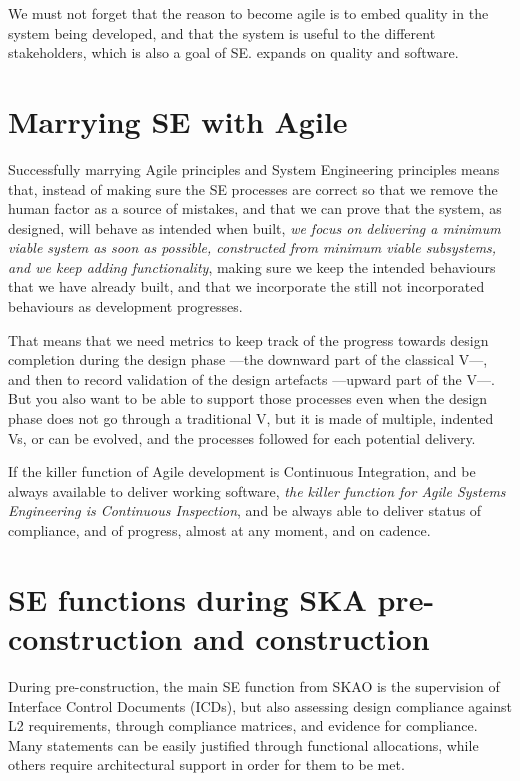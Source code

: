 \documentclass[11pt,twoside]{article}
\begin{document}
We must not forget that the reason to become agile is to embed quality in the system being developed, and that the system is useful to the different stakeholders, which is also a goal of SE. \citet{I10-1_adassxxvii} expands on quality and software.


\section{Marrying SE with Agile} %
\label{sec:se_and_agile}
Successfully marrying Agile principles and System Engineering principles means that, instead of making sure the SE processes are correct so that we remove the human factor as a source of mistakes, and that we can prove that the system, as designed, will behave as intended when built, \emph{we focus on delivering a minimum viable system as soon as possible, constructed from minimum viable subsystems, and we keep adding functionality}, making sure we keep the intended behaviours that we have already built, and that we incorporate the still not incorporated behaviours as development progresses.	

That means that we need metrics to keep track of the progress towards design completion during the design phase ---the downward part of the classical V---, and then to record validation of the design artefacts ---upward part of the V---. But you also want to be able to support those processes even when the design phase does not go through a traditional V, but it is made of multiple, indented Vs, or can be evolved, and the processes followed for each potential delivery.

If the killer function of Agile development is Continuous Integration, and be always available to deliver working software, \emph{the killer function for Agile Systems Engineering is Continuous Inspection}, and be always able to deliver status of compliance, and of progress, almost at any moment, and on cadence.	


\section{SE functions during SKA pre-construction and construction} %
\label{sec:se_functions_during_ska_pre_construction}
During pre-construction, the main SE function from SKAO is the supervision of Interface Control Documents (ICDs), but also assessing design compliance against L2 requirements, through compliance matrices, and evidence for compliance. Many statements can be easily justified through functional allocations, while others require architectural support in order for them to be met.
\end{document}

